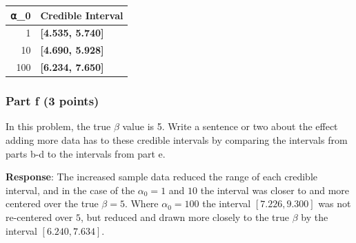 \documentclass[
]{article}
\newenvironment{Shaded}{\begin{snugshade}}{\end{snugshade}}
\newcommand{\AttributeTok}[1]{\textcolor[rgb]{0.13,0.29,0.53}{#1}}
\newcommand{\CommentTok}[1]{\textcolor[rgb]{0.56,0.35,0.01}{\textit{#1}}}
\newcommand{\ConstantTok}[1]{\textcolor[rgb]{0.56,0.35,0.01}{#1}}
\newcommand{\DecValTok}[1]{\textcolor[rgb]{0.00,0.00,0.81}{#1}}
\newcommand{\FunctionTok}[1]{\textcolor[rgb]{0.13,0.29,0.53}{\textbf{#1}}}
\newcommand{\NormalTok}[1]{#1}
\newcommand{\OtherTok}[1]{\textcolor[rgb]{0.56,0.35,0.01}{#1}}
\newcommand{\SpecialCharTok}[1]{\textcolor[rgb]{0.81,0.36,0.00}{\textbf{#1}}}
\newcommand{\StringTok}[1]{\textcolor[rgb]{0.31,0.60,0.02}{#1}}
\begin{document}
\begin{Shaded}
\end{Shaded}

\begin{longtable}[t]{r>{}l}
\toprule
⍺\_0 & Credible Interval\\
\midrule
1 & \textbf{{}[4.535, 5.740]}\\
10 & \textbf{{}[4.690, 5.928]}\\
100 & \textbf{{}[6.234, 7.650]}\\
\bottomrule
\end{longtable}

\hypertarget{part-f-3-points}{%
\subsubsection{Part f (3 points)}\label{part-f-3-points}}

In this problem, the true \(\beta\) value is 5. Write a sentence or two
about the effect adding more data has to these credible intervals by
comparing the intervals from parts b-d to the intervals from part e.

\textbf{Response}: The increased sample data reduced the range of each
credible interval, and in the case of the \(\alpha_0 = 1\) and \(10\)
the interval was closer to and more centered over the true \(\beta=5\).
Where \(\alpha_0 = 100\) the interval \([7.226, 9.300]\) was not
re-centered over \(5\), but reduced and drawn more closely to the true
\(\beta\) by the interval \([6.240,7.634]\).
\end{document}
